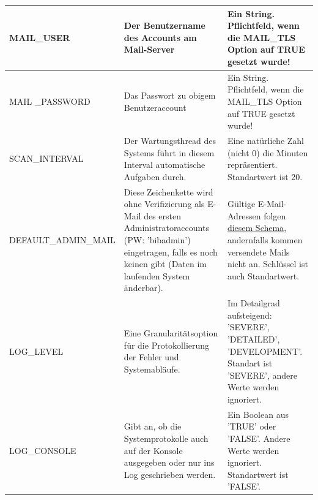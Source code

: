 \documentclass{article}
\begin{document}
\begin{center}
\begin{table}[H]
\begin{tabular} {| m{4cm} | m{6cm} | m{5cm} |}
\hline
MAIL\_USER & Der Benutzername des Accounts am Mail-Server & Ein String. Pflichtfeld, wenn die MAIL\_TLS Option auf TRUE gesetzt wurde!\\
\hline
MAIL \_PASSWORD & Das Passwort zu obigem Benutzeraccount & Ein String. Pflichtfeld, wenn die MAIL\_TLS Option auf TRUE gesetzt wurde!\\
\hline
SCAN\_INTERVAL & Der Wartungsthread des Systems führt in diesem Interval automatische Aufgaben durch. & Eine natürliche Zahl (nicht 0) die Minuten repräsentiert. Standartwert ist 20. \\
\hline
DEFAULT\_ADMIN\_MAIL & Diese Zeichenkette wird ohne Verifizierung als E-Mail des ersten Administratoraccounts (PW: 'bibadmin') eingetragen, falls es noch keinen gibt (Daten im laufenden System änderbar).  & Gültige E-Mail-Adressen folgen \hyperlink{https://datatracker.ietf.org/doc/html/rfc5322}{diesem Schema}, andernfalls kommen versendete Mails nicht an. Schlüssel ist auch Standartwert.\\
\hline
LOG\_LEVEL & Eine Granularitätsoption für die Protokollierung der Fehler und Systemabläufe. & Im Detailgrad aufsteigend: 'SEVERE', 'DETAILED', 'DEVELOPMENT'. Standart ist 'SEVERE', andere Werte werden ignoriert. \\
\hline
LOG\_CONSOLE & Gibt an, ob die Systemprotokolle auch auf der Konsole ausgegeben oder nur ins Log geschrieben werden. & Ein Boolean aus 'TRUE' oder 'FALSE'. Andere Werte werden ignoriert. Standartwert ist 'FALSE'. \\
\hline
\end{tabular}
\end{table}
\end{center}
\end{document}
